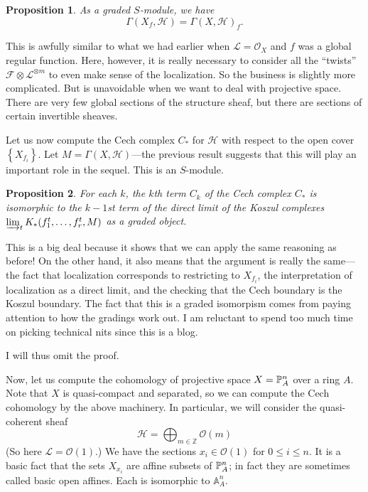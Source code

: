 \documentclass{article}
\newtheorem{proposition}{Proposition}
\begin{document}
\begin{proposition} 
As a graded $S$-module, we have
\[ \Gamma(X_f, \mathcal{H}) = \Gamma(X, \mathcal{H} )_f.  \]
\end{proposition} 

This is awfully similar to what we had earlier when $\mathcal{L} = \mathcal{O}_X$ and
$f$ was a global regular function. Here, however, it is really necessary to
consider all the ``twists'' $\mathcal{F} \otimes \mathcal{L}^{\otimes m}$ to even make
sense of the localization. So the business is slightly more complicated. But is
unavoidable when we want to deal with projective space. There are very few
global sections of the structure sheaf, but there are sections of certain
invertible sheaves.

Let us now compute the Cech complex $C_*$ for $\mathcal{H}$ with respect to
the open cover $\left\{X_{f_i}\right\}$.
Let $M = \Gamma(X, \mathcal{H})$---the previous result suggests that this will
play an important role in the sequel. This is an $S$-module.

\begin{proposition} 
For each $k$, the $k$th term $C_k$ of the Cech complex $C_*$ is isomorphic to
the $k-1$st term of the direct limit of the Koszul complexes $\varinjlim_t K_*(f_1^t, \dots,
f_r^t, M)$ as a graded object. 
\end{proposition} 

This is a big deal because it shows that we can apply the same reasoning as
before! On the other hand, it also means that the argument is really the
same---the fact that localization corresponds to restricting to $X_{f_i}$, the interpretation of localization as a direct limit, and the checking
that the Cech boundary is the Koszul boundary.
The fact that this is a graded isomorpism comes from paying attention to how
the gradings work out. I am reluctant to spend too much time on picking
technical nits since this is a blog.

I will thus omit the proof.

Now, let us compute the cohomology of projective space $X = \P^n_A$ over a ring
$A$. Note that $X$ is quasi-compact and separated, so we can compute the Cech
cohomology by the above machinery.
In particular, we will consider the quasi-coherent sheaf
\[ \mathcal{H}=\bigoplus_{m \in \mathbb{Z}} \mathcal{O}(m)  \]
(So here $\mathcal{L} = \mathcal{O}(1)$.) We have the sections $x_i \in \mathcal{O}(1)$ for $ 0 \leq i
\leq n$. It is a basic fact that the sets $X_{x_i}$ are affine subsets of
$\P^n_A$; in fact they are sometimes called basic open affines. Each is
isomorphic to $ \mathbb{A}^n_A$. 
\end{document}
